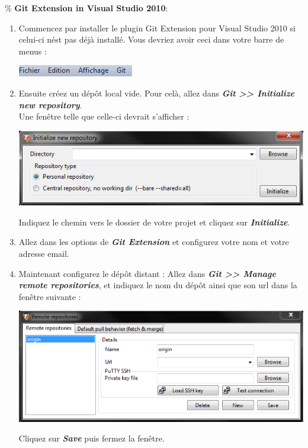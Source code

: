 \documentclass[a4paper]{article}
\begin{document}
\% \textbf{Git Extension in Visual Studio 2010}:\\
\begin{enumerate}
    \item Commencez par installer le plugin Git Extension pour Visual Studio 2010 si
celui-ci nést pas déjà installé. Vous devriez avoir ceci dans votre barre
de menus :
\begin{center}
    \includegraphics{img/VS_git.png}
\end{center}
    \item Ensuite créez un dépôt local vide. Pour celà, allez dans
	\textbf{\emph{Git
	>> Initialize new repository}}. \\
Une fenêtre telle que celle-ci devrait s'afficher :\\
\begin{center}
    \includegraphics{img/VS_new_repo.png}\\ 
\end{center}
Indiquez le chemin vers le dossier de votre projet et cliquez sur
\textbf{\emph{Initialize}}.\\
    \item Allez dans les options de \textbf{\emph{Git Extension}} et
	configurez votre nom et votre adresse email.
    \item Maintenant configurez le dépôt distant : Allez dans \textbf{\emph{Git >>
	Manage remote repositories}}, et indiquez le nom du dépôt ainsi que
	son url dans la fenêtre suivante : \\
    \begin{center}
	\includegraphics[scale=0.85]{img/VS_manage_remote.png} \\
    \end{center}
    Cliquez sur \textbf{\emph{Save}} puis fermez la fenêtre. \\
 

\end{enumerate}
\end{document}
